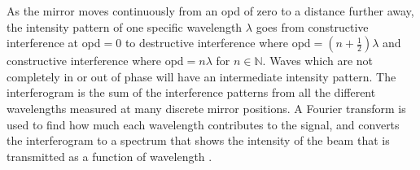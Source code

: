 As the mirror moves continuously from an \ac{opd} of zero to a distance further away, the intensity pattern of one specific wavelength $\lambda$ goes from constructive interference at \ac{opd}$=0$ to destructive interference where \ac{opd}$=(n+\frac{1}{2}) \lambda$ and constructive interference where \ac{opd}$= n \lambda$ for $n\in\mathbb{N}$. Waves which are not completely in or out of phase will have an intermediate intensity pattern. The interferogram is the sum of the interference patterns from all the different wavelengths measured at many discrete mirror positions. A Fourier transform is used to find how much each wavelength contributes to the signal, and converts the interferogram to a spectrum that shows the intensity of the beam that is transmitted as a function of wavelength \citep{smith2011fourier}.

%
%
%
%
